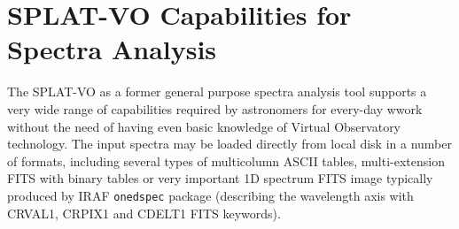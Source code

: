 \documentclass[final,authoryear,5p,times,twocolumn]{elsarticle}
\begin{document}
\section{SPLAT-VO Capabilities  for Spectra Analysis}

The SPLAT-VO as a former general purpose spectra analysis tool supports a very
wide range of capabilities required by astronomers for every-day wwork without
the need of having even basic knowledge of Virtual Observatory technology. The
input spectra may be loaded directly from local disk in a number of formats,
including several types of multicolumn ASCII tables, multi-extension FITS with
binary tables or very important 1D spectrum FITS image typically produced by
IRAF {\tt onedspec} package (describing the wavelength axis with CRVAL1, CRPIX1
and CDELT1 FITS keywords).   
\end{document}
